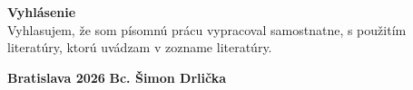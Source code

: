 \begin{titlepage}
    \null\vspace*{16cm} %

    \noindent\textbf{Vyhlásenie}
    \\

    \noindent Vyhlasujem, že som písomnú prácu vypracoval samostnatne, s použitím literatúry, ktorú uvádzam v zozname literatúry.

    \vfill %

    \noindent \textbf{Bratislava 2026} \hfill \textbf{Bc. Šimon Drlička}
\end{titlepage}

